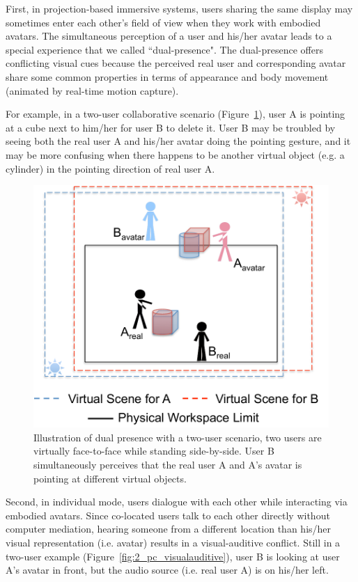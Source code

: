 First, in projection-based immersive systems, users sharing the same display may sometimes enter each other's field of view when they work with embodied avatars. The simultaneous perception of a user and his/her avatar leads to a special experience that we called ``dual-presence". The dual-presence offers conflicting visual cues because the perceived real user and corresponding avatar share some common properties in terms of appearance and body movement (animated by real-time motion capture).

For example, in a two-user collaborative scenario (Figure~\ref{fig:2_pc_dualpresence}), user A is pointing at a cube next to him/her for user B to delete it. User B may be troubled by seeing both the real user A and his/her avatar doing the pointing gesture, and it may be more confusing when there happens to be another virtual object (e.g. a cylinder) in the pointing direction of real user A.

\begin{figure}[htb]
  \centering
  \includegraphics[width=.7\textwidth]{figures/ch2/pc_dualpresence}
  \caption{\label{fig:2_pc_dualpresence}Illustration of dual presence with a two-user scenario, two users are virtually face-to-face while standing side-by-side. User B simultaneously perceives that the real user A and A's avatar is pointing at different virtual objects.}
\end{figure}

Second, in individual mode, users dialogue with each other while interacting via embodied avatars. Since co-located users talk to each other directly without computer mediation, hearing someone from a different location than his/her visual representation (i.e. avatar) results in a visual-auditive conflict. Still in a two-user example (Figure~\ref{fig:2_pc_visualauditive}), user B is looking at user A's avatar in front, but the audio source (i.e. real user A) is on his/her left.

